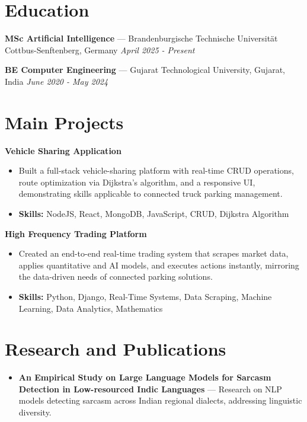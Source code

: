 \documentclass[a4paper,10pt]{article}
\begin{document}
\section*{Education}
\textbf{MSc Artificial Intelligence} — Brandenburgische Technische Universität Cottbus-Senftenberg, Germany \hfill \textit{April 2025 - Present}\par
\vspace{1.5pt}
\textbf{BE Computer Engineering} — Gujarat Technological University, Gujarat, India \hfill \textit{June 2020 - May 2024}\par

\section*{Main Projects}
\textbf{Vehicle Sharing Application}\par
\vspace{1pt}
\begin{itemize}
  \item Built a full-stack vehicle-sharing platform with real-time CRUD operations, route optimization via Dijkstra's algorithm, and a responsive UI, demonstrating skills applicable to connected truck parking management.
  \item \textbf{Skills:} NodeJS, React, MongoDB, JavaScript, CRUD, Dijkstra Algorithm
\end{itemize}
\vspace{3pt}
\textbf{High Frequency Trading Platform}\par
\vspace{1pt}
\begin{itemize}
  \item Created an end-to-end real-time trading system that scrapes market data, applies quantitative and AI models, and executes actions instantly, mirroring the data-driven needs of connected parking solutions.
  \item \textbf{Skills:} Python, Django, Real-Time Systems, Data Scraping, Machine Learning, Data Analytics, Mathematics
\end{itemize}

\section*{Research and Publications}
\begin{itemize}
\item \textbf{An Empirical Study on Large Language Models for Sarcasm Detection in Low-resourced Indic Languages} — Research on NLP models detecting sarcasm across Indian regional dialects, addressing linguistic diversity.
\end{itemize}
\end{document}
